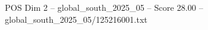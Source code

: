 \begin{textsample}{POS Dim 2 – global\_south\_2025\_05 – Score 28.00 – global\_south\_2025\_05/125216001.txt}
\end{textsample}
